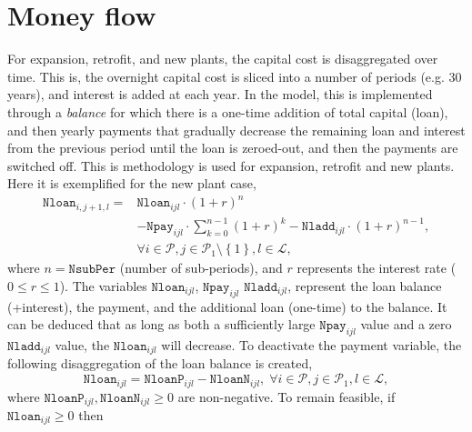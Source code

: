 \documentclass{amsart}
\begin{document}

%
\section{Money flow}
%
For expansion, retrofit, and new plants, the capital cost is disaggregated over
time. This is, the overnight capital cost is sliced into a number of periods
(e.g.  30 years), and interest is added at each year. In the model, this is
implemented through a \emph{balance} for which there is a one-time addition of
total capital (loan), and then yearly payments that gradually decrease the
remaining loan and interest from the previous period until the loan is
zeroed-out, and then the payments are switched off. 
%
This is methodology is used for expansion, retrofit and new plants. Here it is
exemplified for the new plant case,
%
\begin{equation}\begin{split}
    \mathtt{Nloan}_{i,j+1,l} =& \mathtt{Nloan}_{ijl} \cdot \left(1+r\right)^n \\
    &- \mathtt{Npay}_{ijl} \cdot \sum^{n-1}_{k=0} \left(1+r\right)^k 
    - \mathtt{Nladd}_{ijl} \cdot \left(1+r\right)^{n-1}, \\
    &\forall i \in \mathcal{P} ,
    j \in \mathcal{P}_1 \setminus \left\{1\right\},
    l \in \mathcal{L},
\end{split}\end{equation}
%
where $n=\mathtt{NsubPer}$ (number of sub-periods), and $r$ represents the
interest rate ($0\leq r\leq 1$). The variables $\mathtt{Nloan}_{ijl}$,
$\mathtt{Npay}_{ijl}$ $\mathtt{Nladd}_{ijl}$, represent the loan balance
(+interest), the payment, and the additional loan (one-time) to the balance. It
can be deduced that as long as both a sufficiently large $\mathtt{Npay}_{ijl}$
value and a zero $\mathtt{Nladd}_{ijl}$ value, the $\mathtt{Nloan}_{ijl}$ will
decrease. 
%
To deactivate the payment variable, the following disaggregation of the loan
balance is created,
%
\begin{equation}
    \mathtt{Nloan}_{ijl} = \mathtt{NloanP}_{ijl} - \mathtt{NloanN}_{ijl}
    , \; \forall i\in \mathcal{P}, j\in \mathcal{P}_1, l\in \mathcal{L},
\end{equation}
%
where $\mathtt{NloanP}_{ijl}, \mathtt{NloanN}_{ijl}\geq 0$ are non-negative. 
To remain feasible, if $\mathtt{Nloan}_{ijl} \ge 0$ then 
\end{document}
